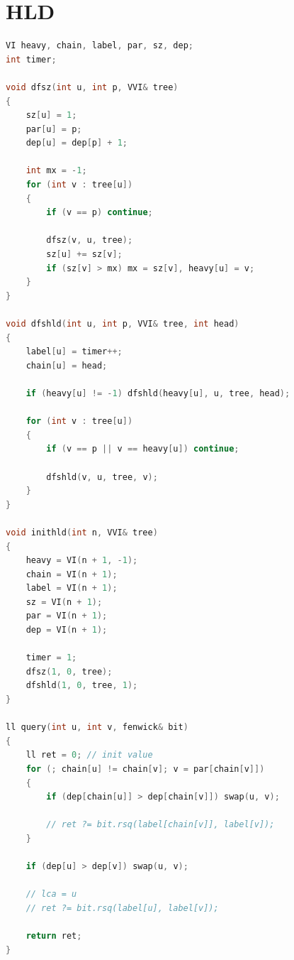 \section{HLD}
\begin{lstlisting}[language=C++]
VI heavy, chain, label, par, sz, dep;
int timer;

void dfsz(int u, int p, VVI& tree)
{
    sz[u] = 1;
    par[u] = p;
    dep[u] = dep[p] + 1;

    int mx = -1;
    for (int v : tree[u])
    {
        if (v == p) continue;

        dfsz(v, u, tree);
        sz[u] += sz[v];
        if (sz[v] > mx) mx = sz[v], heavy[u] = v;
    }
}

void dfshld(int u, int p, VVI& tree, int head)
{
    label[u] = timer++;
    chain[u] = head;

    if (heavy[u] != -1) dfshld(heavy[u], u, tree, head);

    for (int v : tree[u])
    {
        if (v == p || v == heavy[u]) continue;

        dfshld(v, u, tree, v);
    }
}

void inithld(int n, VVI& tree)
{
    heavy = VI(n + 1, -1);
    chain = VI(n + 1);
    label = VI(n + 1);
    sz = VI(n + 1);
    par = VI(n + 1);
    dep = VI(n + 1);

    timer = 1;
    dfsz(1, 0, tree);
    dfshld(1, 0, tree, 1);
}

ll query(int u, int v, fenwick& bit)
{
    ll ret = 0; // init value
    for (; chain[u] != chain[v]; v = par[chain[v]])
    {
        if (dep[chain[u]] > dep[chain[v]]) swap(u, v);
        
        // ret ?= bit.rsq(label[chain[v]], label[v]);
    }

    if (dep[u] > dep[v]) swap(u, v);

    // lca = u
    // ret ?= bit.rsq(label[u], label[v]);

    return ret;
}
\end{lstlisting}
\sectionend

